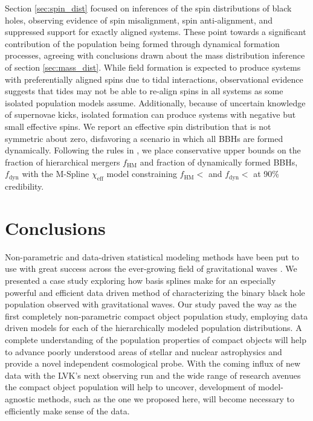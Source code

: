 Section \ref{sec:spin_dist} focused on inferences of the spin distributions of black holes, observing evidence of spin misalignment, spin anti-alignment, and suppressed support 
for exactly aligned systems. These point towards a significant contribution of the population being formed through dynamical formation processes, agreeing with 
conclusions drawn about the mass distribution inference of section \ref{sec:mass_dist}. While field formation is expected to produce systems with preferentially 
aligned spins due to tidal interactions, observational evidence suggests that tides may not be able to re-align spins in all systems as some 
isolated population models assume. Additionally, because of uncertain knowledge of supernovae kicks, isolated formation can produce systems with negative but small effective spins. 
We report an effective spin distribution that is not symmetric about zero, disfavoring a scenario in which all BBHs are formed dynamically. Following the rules in \citet{Fishbach_2022}, 
we place conservative upper bounds on the fraction of hierarchical mergers $f_\mathrm{HM}$ and fraction of dynamically formed BBHs, $f_\mathrm{dyn}$ with 
the M-Spline $\chi_\mathrm{eff}$ model constraining $f_\mathrm{HM} < $\result{$\macros[ChiEffective][iid][frac_hm][10th percentile]$} 
and $f_\mathrm{dyn} < $ at 90\% credibility. 

\section{Conclusions}\label{sec:conclusion}

Non-parametric and data-driven statistical modeling methods have been put to use with great success across the ever-growing field of gravitational 
waves \citep{B_Farr_etal_2014,Littenberg_2015,Mandel_2016,Edwards_2018,Doctor_GPR,Edelman_2021,Vitale_2021,Tiwari_2021_a,Tiwari_2021_b,Edelman_2022ApJ,Tiwari_2022ApJ}. 
We presented a case study exploring how basis splines make for an especially powerful and efficient data driven method of characterizing the binary black hole population observed 
with gravitational waves. Our study paved the way as the first completely non-parametric compact object population study, employing data driven models for each of the hierarchically 
modeled population distributions. A complete understanding of the population properties of compact objects will help to advance poorly understood areas of stellar and 
nuclear astrophysics and provide a novel independent cosmological probe. With the coming influx of new data with the LVK's next observing run and the wide 
range of research avenues the compact object population will help to uncover, development of model-agnostic methods, such as the one we proposed here, will become necessary to efficiently make
sense of the data.  
